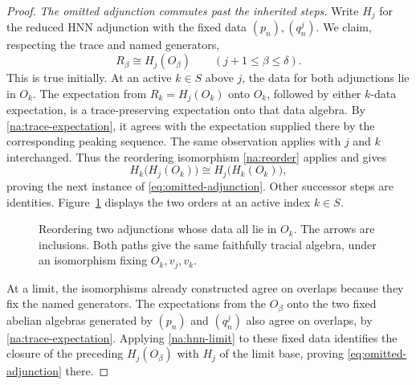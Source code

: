 \begin{proof}
\smallskip\noindent
\emph{The omitted adjunction commutes past the inherited steps.}
Write $H_j$ for the reduced HNN adjunction with the fixed data
$(p_n),(q_n^j)$. We claim, respecting the trace and named generators,
\begin{equation}\label{eq:omitted-adjunction}
 R_\beta\cong H_j(O_\beta)
 \qquad(j+1\le\beta\le\delta).
\end{equation}
This is true initially. At an active $k\in S$ above $j$, the data
for both adjunctions lie in $O_k$. The expectation from
$R_k=H_j(O_k)$ onto $O_k$, followed by either $k$-data expectation,
is a trace-preserving expectation onto that data algebra. By
\cref{na:trace-expectation}, it agrees with the expectation supplied
there by the corresponding peaking sequence. The same observation
applies with $j$ and $k$ interchanged. Thus the reordering
isomorphism \cref{na:reorder} applies and gives
\[
 H_k\bigl(H_j(O_k)\bigr)
 \cong H_j\bigl(H_k(O_k)\bigr),
\]
proving the next instance of \eqref{eq:omitted-adjunction}.
Other successor steps are identities. Figure~\ref{fig:reordering}
displays the two orders at an active index $k\in S$.

\begin{figure}[htbp]
\centering
{}
\caption{Reordering two adjunctions whose data all lie in $O_k$.
The arrows are inclusions. Both paths give the same faithfully
tracial algebra, under an isomorphism fixing $O_k,v_j,v_k$.}
\label{fig:reordering}
\end{figure}

At a limit, the isomorphisms already constructed agree on overlaps
because they fix the named generators. The expectations from the
$O_\beta$ onto the two fixed abelian algebras generated by $(p_n)$
and $(q_n^j)$ also agree on overlaps, by
\cref{na:trace-expectation}. Applying \cref{na:hnn-limit} to these
fixed data identifies the closure of the preceding $H_j(O_\beta)$
with $H_j$ of the limit base, proving
\eqref{eq:omitted-adjunction} there.


\end{proof}

